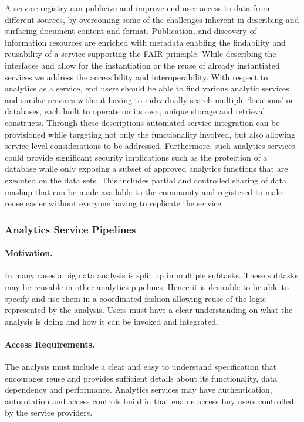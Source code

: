 \documentclass[12pt]{article}
\begin{document}
A service registry can publicize and improve end user access to data from different sources, by overcoming some of the challenges inherent in describing and surfacing document content and format. Publication, and discovery of information resources are enriched with metadata enabling the findability and reusability of a service supporting the FAIR principle. While describing the interfaces and allow for the instantiation or the reuse of already instantiated services we address the accessibility and interoperability. With respect to analytics as a service, end users should be able to find various analytic services and similar services without having to individually search multiple ‘locations’ or databases, each built to operate on its own, unique storage and retrieval constructs. Through these descriptions automated service integration can be provisioned while targeting not only the functionality involved, but also allowing service level considerations to be addressed. Furthermore, such analytics services could provide significant security implications such as the protection of a database while only exposing a subset of approved analytics functions that are executed on the data sets. This includes partial and controlled sharing of data mashup that can be made available to the community and registered to make reuse easier without everyone having to replicate the service.




\subsubsection{Analytics Service Pipelines}

\paragraph{Motivation.} In many cases a big data analysis is split up in multiple subtasks. These subtasks may be reusable in other analytics pipelines. Hence it is desirable to be able to specify and use them in a coordinated fashion allowing reuse of the logic represented by the analysis. Users must have a clear understanding on what the analysis is doing and how it can be invoked and integrated. 

\paragraph{Access Requirements.} The analysis must include a clear and easy to understand specification that encourages reuse and provides sufficient details about its functionality, data dependency and performance. Analytics services may have authentication, autorotation and access controls build in that enable access buy users controlled by the service providers.
\end{document}
